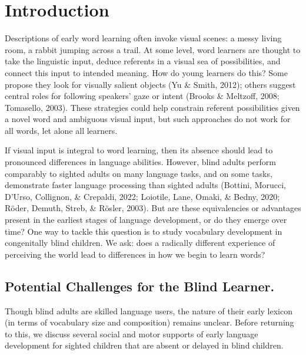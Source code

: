 \documentclass[
  man,floatsintext]{apa6}
\begin{document}
\hypertarget{introduction}{%
\section{Introduction}\label{introduction}}

Descriptions of early word learning often invoke visual scenes: a messy living room, a rabbit jumping across a trail. At some level, word learners are thought to take the linguistic input, deduce referents in a visual sea of possibilities, and connect this input to intended meaning. How do young learners do this? Some propose they look for visually salient objects (Yu \& Smith, 2012); others suggest central roles for following speakers' gaze or intent (Brooks \& Meltzoff, 2008; Tomasello, 2003). These strategies could help constrain referent possibilities given a novel word and ambiguous visual input, but such approaches do not work for all words, let alone all learners.

If visual input is integral to word learning, then its absence should lead to pronounced differences in language abilities. However, blind adults perform comparably to sighted adults on many language tasks, and on some tasks, demonstrate faster language processing than sighted adults (Bottini, Morucci, D'Urso, Collignon, \& Crepaldi, 2022; Loiotile, Lane, Omaki, \& Bedny, 2020; Röder, Demuth, Streb, \& Rösler, 2003). But are these equivalencies or advantages present in the earliest stages of language development, or do they emerge over time? One way to tackle this question is to study vocabulary development in congenitally blind children. We ask: does a radically different experience of perceiving the world lead to differences in how we begin to learn words?

\hypertarget{potential-challenges-for-the-blind-learner.}{%
\subsection{Potential Challenges for the Blind Learner.}\label{potential-challenges-for-the-blind-learner.}}

Though blind adults are skilled language users, the nature of their early lexicon (in terms of vocabulary size and composition) remains unclear. Before returning to this, we discuss several social and motor supports of early language development for sighted children that are absent or delayed in blind children.
\end{document}
